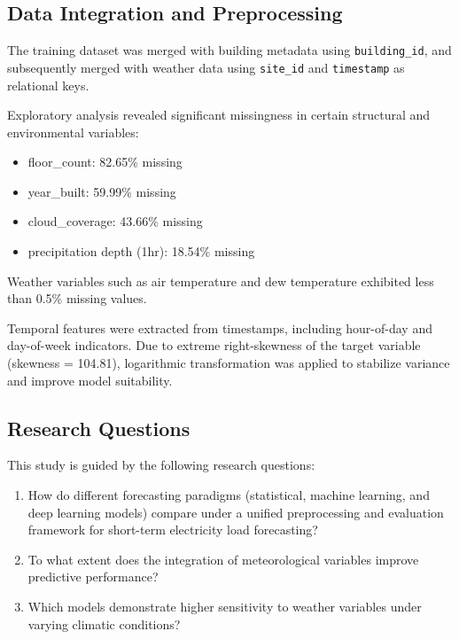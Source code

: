 \documentclass[conference]{IEEEtran}
\begin{document}
\subsection{Data Integration and Preprocessing}

The training dataset was merged with building metadata using \texttt{building\_id}, and subsequently merged with weather data using \texttt{site\_id} and \texttt{timestamp} as relational keys.

Exploratory analysis revealed significant missingness in certain structural and environmental variables:

\begin{itemize}
    \item floor\_count: 82.65\% missing
    \item year\_built: 59.99\% missing
    \item cloud\_coverage: 43.66\% missing
    \item precipitation depth (1hr): 18.54\% missing
\end{itemize}

Weather variables such as air temperature and dew temperature exhibited less than 0.5\% missing values.

Temporal features were extracted from timestamps, including hour-of-day and day-of-week indicators. Due to extreme right-skewness of the target variable (skewness = 104.81), logarithmic transformation was applied to stabilize variance and improve model suitability.


\subsection{Research Questions}
This study is guided by the following research questions:
\begin{enumerate}
    \item How do different forecasting paradigms (statistical, machine learning, and deep learning models) compare under a unified preprocessing and evaluation framework for short-term electricity load forecasting?

    \item To what extent does the integration of meteorological variables improve predictive performance?

    \item Which models demonstrate higher sensitivity to weather variables under varying climatic conditions?
\end{enumerate}
\end{document}

